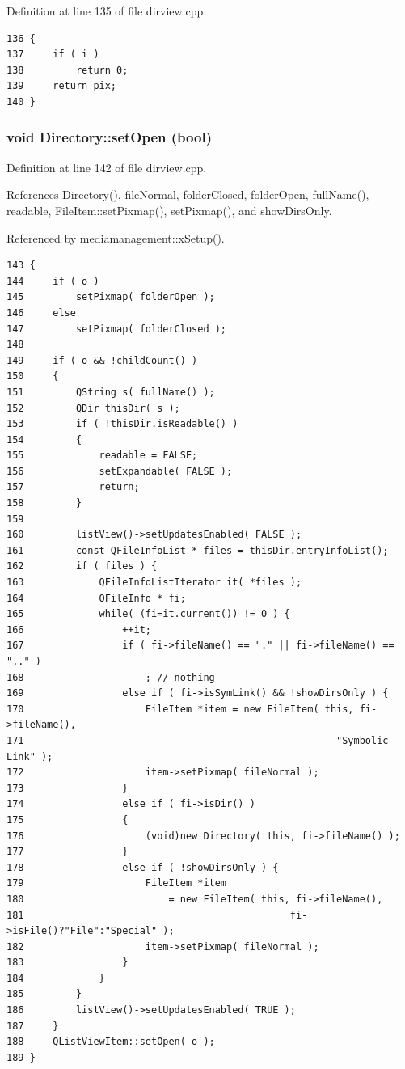 Definition at line 135 of file dirview.cpp.



\footnotesize\begin{verbatim}136 {
137     if ( i )
138         return 0;
139     return pix;
140 }
\end{verbatim}\normalsize 
{}
\subsubsection{\setlength{\rightskip}{0pt plus 5cm}void Directory::set\-Open (bool)}\label{classDirectory_Directorya5}




Definition at line 142 of file dirview.cpp.

References Directory(), file\-Normal, folder\-Closed, folder\-Open, full\-Name(), readable, File\-Item::set\-Pixmap(), set\-Pixmap(), and show\-Dirs\-Only.

Referenced by mediamanagement::x\-Setup().



\footnotesize\begin{verbatim}143 {
144     if ( o )
145         setPixmap( folderOpen );
146     else
147         setPixmap( folderClosed );
148 
149     if ( o && !childCount() ) 
150     {
151         QString s( fullName() );
152         QDir thisDir( s );
153         if ( !thisDir.isReadable() ) 
154         {
155             readable = FALSE;
156             setExpandable( FALSE );
157             return;
158         }
159 
160         listView()->setUpdatesEnabled( FALSE );
161         const QFileInfoList * files = thisDir.entryInfoList();
162         if ( files ) {
163             QFileInfoListIterator it( *files );
164             QFileInfo * fi;
165             while( (fi=it.current()) != 0 ) {
166                 ++it;
167                 if ( fi->fileName() == "." || fi->fileName() == ".." )
168                     ; // nothing
169                 else if ( fi->isSymLink() && !showDirsOnly ) {
170                     FileItem *item = new FileItem( this, fi->fileName(),
171                                                      "Symbolic Link" );
172                     item->setPixmap( fileNormal );
173                 }
174                 else if ( fi->isDir() )
175                 {
176                     (void)new Directory( this, fi->fileName() );
177                 }
178                 else if ( !showDirsOnly ) {
179                     FileItem *item
180                         = new FileItem( this, fi->fileName(),
181                                              fi->isFile()?"File":"Special" );
182                     item->setPixmap( fileNormal );
183                 }
184             }
185         }
186         listView()->setUpdatesEnabled( TRUE );
187     }
188     QListViewItem::setOpen( o );
189 }
\end{verbatim}\normalsize 


